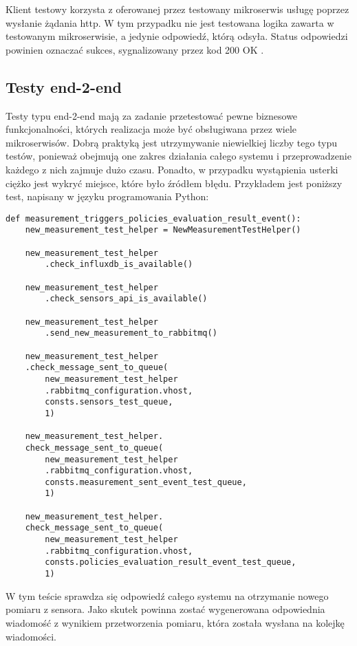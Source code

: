 Klient testowy korzysta z oferowanej przez testowany mikroserwis usługę poprzez 
wysłanie żądania http. W tym przypadku nie jest testowana logika zawarta w testowanym 
mikroserwisie, a jedynie odpowiedź, którą odsyła. Status odpowiedzi powinien oznaczać 
sukces, sygnalizowany przez kod 200 OK \cite{fielding1999}.

\subsection{Testy end-2-end}

Testy typu end-2-end mają za zadanie przetestować pewne biznesowe 
funkcjonalności, których realizacja może być obsługiwana przez wiele mikroserwisów. 
Dobrą praktyką jest utrzymywanie niewielkiej liczby tego typu testów, ponieważ 
obejmują one zakres działania całego systemu i przeprowadzenie każdego z nich zajmuje dużo 
czasu. Ponadto, w przypadku wystąpienia usterki ciężko jest wykryć miejsce, które 
było źródłem błędu.
Przykładem jest poniższy test, napisany w języku programowania Python:

\begin{lstlisting}
def measurement_triggers_policies_evaluation_result_event():
    new_measurement_test_helper = NewMeasurementTestHelper()

    new_measurement_test_helper
        .check_influxdb_is_available()

    new_measurement_test_helper
        .check_sensors_api_is_available()

    new_measurement_test_helper
        .send_new_measurement_to_rabbitmq()

    new_measurement_test_helper
    .check_message_sent_to_queue(
        new_measurement_test_helper
        .rabbitmq_configuration.vhost,
        consts.sensors_test_queue, 
        1)

    new_measurement_test_helper.
    check_message_sent_to_queue(
        new_measurement_test_helper
        .rabbitmq_configuration.vhost,
        consts.measurement_sent_event_test_queue, 
        1)

    new_measurement_test_helper.
    check_message_sent_to_queue(
        new_measurement_test_helper
        .rabbitmq_configuration.vhost,
        consts.policies_evaluation_result_event_test_queue, 
        1)
\end{lstlisting}

W tym teście sprawdza się odpowiedź całego systemu na otrzymanie nowego pomiaru 
z sensora. Jako skutek powinna zostać wygenerowana odpowiednia wiadomość z wynikiem 
przetworzenia pomiaru, która została wysłana na kolejkę wiadomości.

